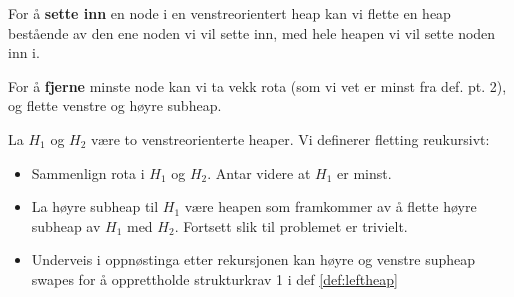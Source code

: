 For å \textbf{sette inn} en node i en venstreorientert heap kan vi flette en heap bestående av den ene noden vi vil sette inn, med hele heapen vi vil sette noden inn i.

For å \textbf{fjerne} minste node kan vi ta vekk rota (som vi vet er minst fra def. pt. 2), og flette venstre og høyre subheap.

\newpage
\begin{theorem}\label{def:heapmerge}
	La $ H_1 $ og $ H_2 $ være to venstreorienterte heaper. Vi definerer fletting reukursivt:
	\begin{itemize}
		\item Sammenlign rota i $ H_1 $ og $ H_2 $. Antar videre at $ H_1 $ er minst.
		\item La høyre subheap til $ H_1 $ være heapen som framkommer av å flette høyre subheap av $ H_1 $ med $ H_2 $. Fortsett slik til problemet er trivielt.
		\item Underveis i oppnøstinga etter rekursjonen kan høyre og venstre supheap swapes for å opprettholde strukturkrav 1 i def \ref{def:leftheap}
	\end{itemize}
\end{theorem}

